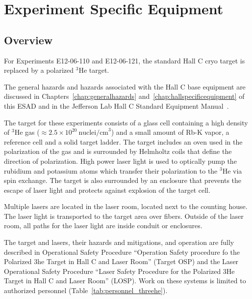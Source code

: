 \chapter{Experiment Specific Equipment}
\label{chap:expspecific}



\section{Overview}
For Experiments E12-06-110 and E12-06-121, the standard Hall C cryo
target is replaced by a polarized ${}^3$He target.

The general hazards and hazards associated with the Hall C base
equipment are discussed in Chapters~\ref{chap:generalhazards}
and~\ref{chap:hallspecificequipment} of this ESAD and in the Jefferson
Lab Hall C Standard Equipment Manual~\cite{HallCosp}.

The target for these experiments consists of a glass cell containing a
high density of ${}^3$He gas
($\approx 2.5 \times 10^{20}~\textrm{nuclei/cm}^3$)
and a small amount of Rb-K vapor, a reference cell and a solid target
ladder.  The target includes an oven used in the polarization of the
gas and is surrounded by Helmholtz coils that define the direction of
polarization.  High power laser light is used to optically pump the rubidium
and potassium atoms which transfer their polarization to the ${}^3$He
via spin exchange.
The target is also surrounded by an enclosure that prevents the escape of
laser light and protects against explosion of the target cell.

Multiple lasers are located in the laser room, located next to the counting
house.  The laser light is transported to the target area over
fibers.  Outside of the laser room, all paths for the laser light are
inside conduit or enclosures.

The target and lasers, their hazards and mitigations, and operation
are fully described in Operational Safety Procedure ``Operation Safety procedure fo the Polarized
3he Target in Hall C and Laser Room'' (Target OSP) and the Laser
Operational Safety Procedure ``Laser Safety Procedure for the
Polarized 3He Target in Hall C and Laser Room'' (LOSP).  Work on these
systems is limited to authorized personnel (Table~\ref{tab:personnel_threehe}).

